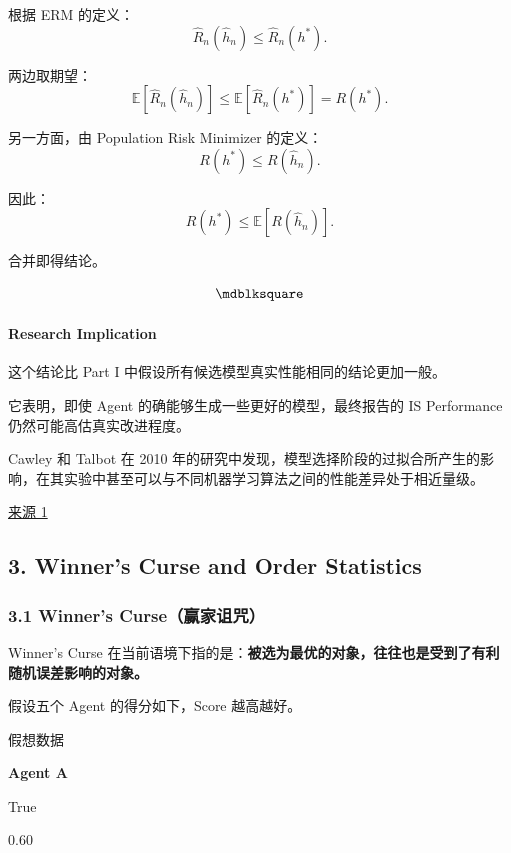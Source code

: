根据 ERM 的定义：
\[\widehat R_n(\hat h_n)
\leq
\widehat R_n(h^*).\]

两边取期望：
\[\mathbb E[\widehat R_n(\hat h_n)]
\leq
\mathbb E[\widehat R_n(h^*)]
=
R(h^*).\]

另一方面，由 Population Risk Minimizer 的定义：
\[R(h^*)\leq R(\hat h_n).\]

因此：
\[R(h^*)\leq\mathbb E[R(\hat h_n)].\]

合并即得结论。

\[\hfill\blacksquare\]

\hypertarget{part-2-16-0001-research-implication}{%
\paragraph{Research Implication}\label{part-2-16-0001-research-implication}}

这个结论比 Part I 中假设所有候选模型真实性能相同的结论更加一般。

它表明，即使 Agent 的确能够生成一些更好的模型，最终报告的 IS Performance 仍然可能高估真实改进程度。

Cawley 和 Talbot 在 2010 年的研究中发现，模型选择阶段的过拟合所产生的影响，在其实验中甚至可以与不同机器学习算法之间的性能差异处于相近量级。

\href{https://www.jmlr.org/beta/papers/v11/cawley10a.html}{来源 1}

\hypertarget{part-2-16-0001-winners-curse-and-order-statistics}{%
\subsection{3. Winner's Curse and Order Statistics}\label{part-2-16-0001-winners-curse-and-order-statistics}}

\hypertarget{part-2-16-0001-winners-curseux8d62ux5bb6ux8bc5ux5492}{%
\subsubsection{3.1 Winner's Curse（赢家诅咒）}\label{part-2-16-0001-winners-curseux8d62ux5bb6ux8bc5ux5492}}

Winner's Curse 在当前语境下指的是：\textbf{被选为最优的对象，往往也是受到了有利随机误差影响的对象。}

假设五个 Agent 的得分如下，Score 越高越好。

假想数据

\textbf{Agent A}

True

0.60

